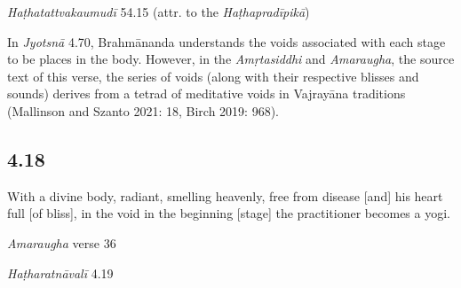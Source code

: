 \begin{ekdosis}
\begin{testimonia}[hp04_017]
\emph{Haṭhatattvakaumudī} 54.15 (attr. to the \emph{Haṭhapradīpikā})
\begin{versinnote}
\end{versinnote}
\end{testimonia}

\begin{philcomm}[hp04_017]
In \emph{Jyotsnā} 4.70, Brahmānanda understands the voids associated with each stage to be places in the body. However, in the \emph{Amṛtasiddhi} and \emph{Amaraugha}, the source text of this verse, the series of voids (along with their respective blisses and sounds) derives from a tetrad of meditative voids in Vajrayāna traditions (Mallinson and Szanto 2021: 18, Birch 2019: 968). 
\end{philcomm}

\subsection*{4.18}
\begin{translation}[hp04_018]
With a divine body, radiant, smelling heavenly, free from disease [and] his heart full [of bliss], in the void in the beginning [stage] the practitioner becomes a yogi.

\end{translation}

\begin{sources}[hp04_018]
\emph{Amaraugha} verse 36
\begin{versinnote}
\tl{\var{°hṛdaye ] \emph{Amaraugha}, °hṛdayaḥ \emph{Amaraughaprabodha}}\\!}
\end{versinnote}
\end{sources}

\begin{testimonia}[hp04_018]
\emph{Haṭharatnāvalī} 4.19
\begin{versinnote}
\end{versinnote}


\end{testimonia}
\end{ekdosis}
